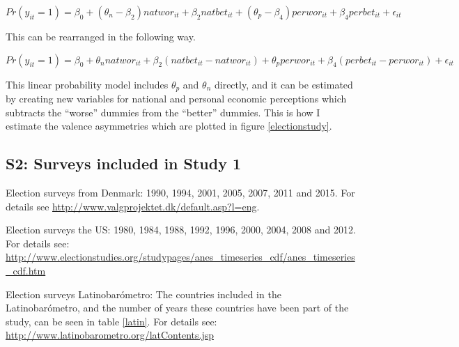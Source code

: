\documentclass[a4paper,11pt]{article}
\begin{document}
	\begin{equation}
		Pr(y_{it}=1)=\beta_0 + (\theta_n - \beta_2) natwor_{it} + \beta_2 natbet_{it} + (\theta_p - \beta_4) perwor_{it} + \beta_4 perbet_{it} + \epsilon_{it}
	\end{equation}
	
	This can be rearranged in the following way.
	
	\begin{equation}
		Pr(y_{it}=1)=\beta_0 + \theta_n natwor_{it} + \beta_2 (natbet_{it}-natwor_{it}) + \theta_p perwor_{it} + \beta_4 (perbet_{it} - perwor_{it}) + \epsilon_{it}
	\end{equation}
	
	This linear probability model includes $\theta_p$ and $\theta_n$ directly, and it can be estimated by creating new variables for national and personal economic perceptions which subtracts the ``worse'' dummies from the ``better'' dummies. This is how I estimate the valence asymmetries which are plotted in figure \ref{electionstudy}.
	
	
	
	\subsection*{S2: Surveys included in Study 1}
	
	Election surveys from Denmark: 1990, 1994, 2001, 2005, 2007, 2011 and 2015. For details see  
	\url{http://www.valgprojektet.dk/default.asp?l=eng}.
	
	Election surveys the US: 1980, 1984, 1988, 1992, 1996, 2000, 2004, 2008 and 2012. For details see: \url{http://www.electionstudies.org/studypages/anes_timeseries_cdf/anes_timeseries_cdf.htm}
	
	Election surveys Latinobarómetro: The countries included in the Latinobarómetro, and the number of years these countries have been part of the study, can be seen in table \ref{latin}. For details see: \url{http://www.latinobarometro.org/latContents.jsp}
	
\end{document}
